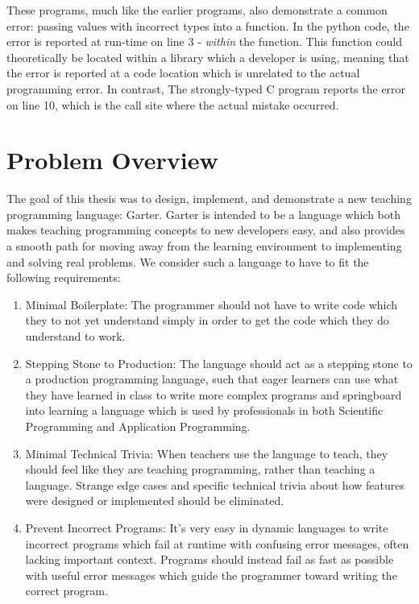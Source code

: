 \begin{minipage}[t]{0.5\textwidth}

\end{minipage}
\begin{minipage}[t]{0.5\textwidth}

\end{minipage}

These programs, much like the earlier programs, also demonstrate a common error:
passing values with incorrect types into a function. In the python code, the
error is reported at run-time on line 3 - \emph{within} the function. This
function could theoretically be located within a library which a developer is
using, meaning that the error is reported at a code location which is unrelated
to the actual programming error. In contrast, The strongly-typed C program
reports the error on line 10, which is the call site where the actual mistake
occurred.


\section{Problem Overview}
\label{sec:requirements}

The goal of this thesis was to design, implement, and demonstrate a new teaching
programming language: Garter. Garter is intended to be a language which both
makes teaching programming concepts to new developers easy, and also provides
a smooth path for moving away from the learning environment to implementing and
solving real problems. We consider such a language to have to fit the following
requirements:

\begin{enumerate}
\item Minimal Boilerplate: The programmer should not have to write code which
they to not yet understand simply in order to get the code which they do
understand to work.
\item Stepping Stone to Production: The language should act as a stepping stone
to a production programming language, such that eager learners can use what they
have learned in class to write more complex programs and springboard into
learning a language which is used by professionals in both Scientific
Programming and Application Programming.
\item Minimal Technical Trivia: When teachers use the language to teach, they
should feel like they are teaching programming, rather than teaching a language.
Strange edge cases and specific technical trivia about how features were
designed or implemented should be eliminated.
\item Prevent Incorrect Programs: It's very easy in dynamic languages to write
incorrect programs which fail at runtime with confusing error messages, often
lacking important context. Programs should instead fail as fast as possible with
useful error messages which guide the programmer toward writing the correct
program.
\end{enumerate}

